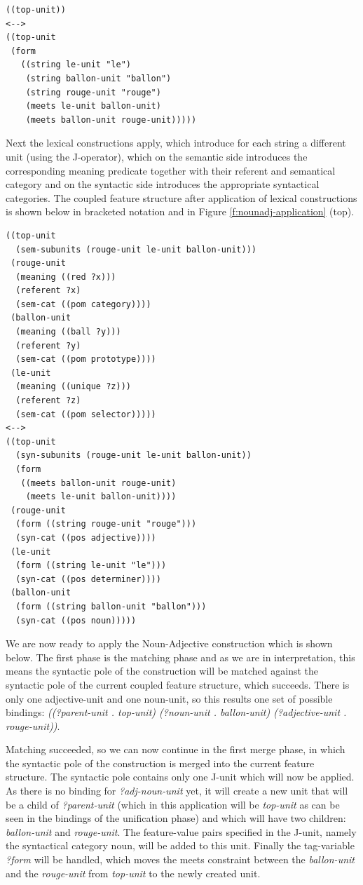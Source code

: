 \footnotesize
\begin{Verbatim}[frame=lines, label=Initial Structure]
((top-unit))
<-->
((top-unit
 (form
   ((string le-unit "le")
    (string ballon-unit "ballon")
    (string rouge-unit "rouge")
    (meets le-unit ballon-unit)
    (meets ballon-unit rouge-unit)))))
\end{Verbatim}
\normalsize

Next the lexical constructions apply, which introduce for each string
a different unit (using the J-operator), which on the semantic side
introduces the corresponding meaning predicate together with their
referent and semantical category and on the syntactic side introduces
the appropriate syntactical categories. The coupled feature structure
after application of lexical constructions is shown below in bracketed
notation and in Figure \ref{f:nounadj-application} (top).

\footnotesize
\begin{Verbatim}[frame=lines, label=Structure before application of the Noun-Adjective construction]
((top-unit
  (sem-subunits (rouge-unit le-unit ballon-unit)))
 (rouge-unit
  (meaning ((red ?x)))
  (referent ?x)
  (sem-cat ((pom category))))
 (ballon-unit
  (meaning ((ball ?y)))
  (referent ?y)
  (sem-cat ((pom prototype))))
 (le-unit
  (meaning ((unique ?z)))
  (referent ?z)
  (sem-cat ((pom selector)))))
<-->
((top-unit
  (syn-subunits (rouge-unit le-unit ballon-unit))
  (form
   ((meets ballon-unit rouge-unit) 
    (meets le-unit ballon-unit))))
 (rouge-unit
  (form ((string rouge-unit "rouge")))
  (syn-cat ((pos adjective))))
 (le-unit 
  (form ((string le-unit "le"))) 
  (syn-cat ((pos determiner))))
 (ballon-unit
  (form ((string ballon-unit "ballon")))
  (syn-cat ((pos noun)))))
\end{Verbatim}
\normalsize

We are now ready to apply the Noun-Adjective construction which is
shown below. The first phase is the matching phase and as we are in
interpretation, this means the syntactic pole of the construction will
be matched against the syntactic pole of the current coupled feature
structure, which succeeds. There is only one adjective-unit and one
noun-unit, so this results one set of possible bindings:
\emph{((?parent-unit . top-unit) (?noun-unit . ballon-unit)
  (?adjective-unit . rouge-unit))}.

Matching succeeded, so we can now continue in the first merge phase,
in which the syntactic pole of the construction is merged into the
current feature structure. The syntactic pole contains only one J-unit
which will now be applied. As there is no binding for
\emph{?adj-noun-unit} yet, it will create a new unit that will be a
child of \emph{?parent-unit} (which in this application will be
\emph{top-unit} as can be seen in the bindings of the unification
phase) and which will have two children: \emph{ballon-unit} and
\emph{rouge-unit}. The feature-value pairs specified in the J-unit,
namely the syntactical category noun, will be added to this
unit. Finally the tag-variable \emph{?form} will be handled, which
moves the meets constraint between the \emph{ballon-unit} and the
\emph{rouge-unit} from \emph{top-unit} to the newly created unit.

